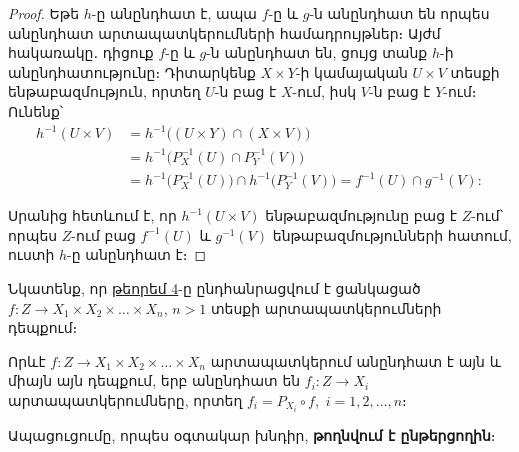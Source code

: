 \documentclass[./main.tex]{subfiles}
\begin{document}
\begin{proof}
Եթե $h$-ը անընդհատ է, ապա $f$-ը և $g$-ն անընդհատ են որպես անընդհատ արտապատկերումների համադրույթներ։ Այժմ հակառակը․ դիցուք $f$-ը և $g$-ն անընդհատ են, ցույց տանք $h$-ի անընդհատությունը։ Դիտարկենք $X \times Y$-ի կամայական $U \times V$ տեսքի ենթաբազմություն, որտեղ $U$-ն բաց է $X$-ում, իսկ $V$-ն բաց է $Y$-ում։ Ունենք՝
\begin{align*}
h^{-1}(U \times V) &= h^{-1}\big((U \times Y) \cap (X \times V)\big) \\&= h^{-1}\big(P_X^{-1}(U) \cap P_Y^{-1}(V)\big)
\\&= h^{-1}\big(P_X^{-1}(U)\big) \cap h^{-1}\big(P_Y^{-1}(V)\big) = f^{-1}(U) \cap g^{-1}(V):
\end{align*}
\par Սրանից հետևում է, որ $h^{-1}(U \times V)$ ենթաբազմությունը բաց է $Z$-ում՝ որպես $Z\textrm{-ում}$ բաց $f^{-1}(U)$ և $g^{-1}(V)$ ենթաբազմությունների հատում, ուստի $h$-ը անընդ\-հատ է։
\end{proof}

\par Նկատենք, որ \hyperref[ch13thm4]{թեորեմ 4}-ը ընդհանրացվում է ցանկացած $f: Z \to X_1 \times X_2 \times \dots \times X_n$, $n > 1$ տեսքի արտապատկերումների դեպքում։

\begin{theorem}\label{ch13thm5}
    Որևէ $f: Z \to X_1 \times X_2 \times \dots \times X_n$ արտապատկերում անընդհատ է այն և միայն այն դեպքում, երբ անընդհատ են $f_i: Z \to X_i$ արտապատկերումները, որտեղ $f_i = P_{X_i} \circ f$,\, $i = 1, 2, \dots, n$։
\end{theorem}

\par Ապացուցումը, որպես օգտակար խնդիր, \textbf{թողնվում է ընթերցողին}։
\end{document}
